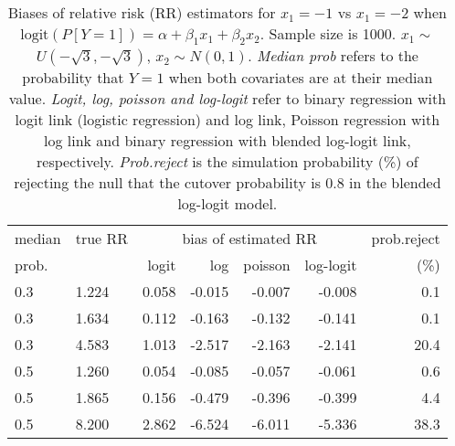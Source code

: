 \documentclass[12pt,a4paper]{article}
\begin{document}
\begin{table}[H] 
\small\sf\centering 
\caption{Biases of relative risk (RR) estimators for $x_1=-1$ vs $x_1=-2$ when $\mbox{logit}(P[Y=1])=\alpha+\beta_1 x_1 + \beta_2 x_2$. Sample size is 1000. $x_1 \sim $$U(-\sqrt{3},-\sqrt{3})$, $x_2 \sim N(0,1)$. {\it Median prob} refers to the probability that $Y=1$ when both covariates are at their median value. {\it Logit, log, poisson and log-logit} refer to binary regression with logit link (logistic regression) and log link, Poisson regression with log link and binary regression with blended log-logit link, respectively. {\it Prob.reject} is the simulation probability (\%) of rejecting the null that the cutover probability is $0.8$ in the blended log-logit model.} 
\begin{tabular}{llrrrrr} 
\toprule 
median & true RR & \multicolumn{4}{c}{bias of estimated RR} & prob.reject \\ 
prob. & & logit & log & poisson & log-logit  & (\%) \\ \midrule 
0.3 & 1.224 & 0.058 & -0.015 & -0.007 & -0.008 &  0.1 \\  
0.3 & 1.634 & 0.112 & -0.163 & -0.132 & -0.141 &  0.1 \\  
0.3 & 4.583 & 1.013 & -2.517 & -2.163 & -2.141 & 20.4 \\  
0.5 & 1.260 & 0.054 & -0.085 & -0.057 & -0.061 &  0.6 \\  
0.5 & 1.865 & 0.156 & -0.479 & -0.396 & -0.399 &  4.4 \\  
0.5 & 8.200 & 2.862 & -6.524 & -6.011 & -5.336 & 38.3 \\  
\bottomrule 
\end{tabular} 
\end{table} 
\end{document}
